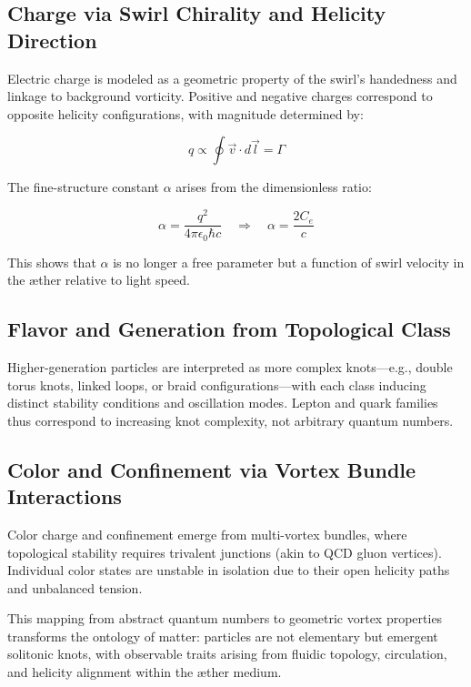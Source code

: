 \subsection{Charge via Swirl Chirality and Helicity Direction}

Electric charge is modeled as a geometric property of the swirl’s handedness and linkage to background vorticity. Positive and negative charges correspond to opposite helicity configurations, with magnitude determined by:

\begin{equation}
q \propto \oint \vec{v} \cdot d\vec{l} = \Gamma
\end{equation}

The fine-structure constant $\alpha$ arises from the dimensionless ratio:

\begin{equation}
\alpha = \frac{q^2}{4\pi \epsilon_0 \hbar c} \quad \Rightarrow \quad \alpha = \frac{2C_e}{c}
\end{equation}

This shows that $\alpha$ is no longer a free parameter but a function of swirl velocity in the æther relative to light speed.

\subsection{Flavor and Generation from Topological Class}

Higher-generation particles are interpreted as more complex knots---e.g., double torus knots, linked loops, or braid configurations---with each class inducing distinct stability conditions and oscillation modes. Lepton and quark families thus correspond to increasing knot complexity, not arbitrary quantum numbers.

\subsection{Color and Confinement via Vortex Bundle Interactions}

Color charge and confinement emerge from multi-vortex bundles, where topological stability requires trivalent junctions (akin to QCD gluon vertices). Individual color states are unstable in isolation due to their open helicity paths and unbalanced tension.

\bigskip

This mapping from abstract quantum numbers to geometric vortex properties transforms the ontology of matter: particles are not elementary but emergent solitonic knots, with observable traits arising from fluidic topology, circulation, and helicity alignment within the æther medium.
